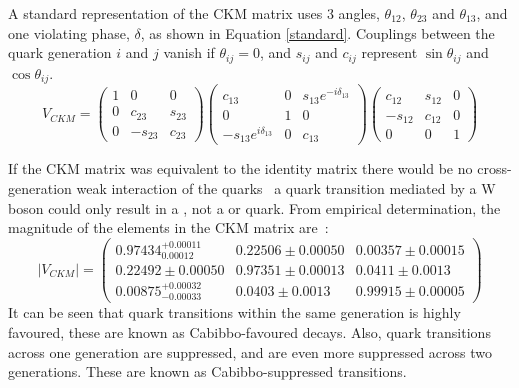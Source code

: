 A standard representation of the CKM matrix uses 3 angles, $\theta_{12}$, $\theta_{23}$ and $\theta_{13}$, and one \CP violating phase, $\delta$, as shown in Equation \ref{standard}. Couplings between the quark generation $i$ and $j$ vanish if $\theta_{ij} = 0$, and $s_{ij}$ and $c_{ij}$ represent $\sin\theta_{ij}$ and $\cos\theta_{ij}$.
\begin{equation}
V_{CKM} = \begin{pmatrix} 1 & 0 & 0 \\ 
0 & c_{23} & s_{23} \\ 
0 & -s_{23} & c_{23} \end{pmatrix}
\begin{pmatrix} c_{13} & 0 & s_{13}e^{-i\delta_{13}} \\ 
0 & 1 & 0 \\ 
-s_{13}e^{i\delta_{13}} & 0 & c_{13} \end{pmatrix}
\begin{pmatrix} c_{12} & s_{12} & 0 \\ 
-s_{12} & c_{12} & 0 \\ 
0 & 0 & 1 \end{pmatrix}
\label{standard}
\end{equation}

If the CKM matrix was equivalent to the identity matrix there would be no cross-generation weak interaction of the quarks \eg\ a \uquark quark transition mediated by a W boson could only result in a \dquark, not a \squark or \bquark quark. From empirical determination, the magnitude of the elements in the CKM matrix are~\cite{PDG2016}:
\begin{equation}
| V_{CKM} | = \begin{pmatrix} 0.97434^{+0.00011}_{0.00012} & 0.22506 \pm 0.00050 & 0.00357 \pm 0.00015 \\ 0.22492 \pm 0.00050 & 0.97351 \pm 0.00013 & 0.0411 \pm 0.0013 \\ 0.00875^{+0.00032}_{-0.00033} & 0.0403 \pm 0.0013 & 0.99915 \pm 0.00005 \end{pmatrix}
\end{equation}
It can be seen that quark transitions within the same generation is highly favoured, these are known as Cabibbo-favoured decays. Also, quark transitions across one generation are suppressed, and are even more suppressed across two generations. These are known as Cabibbo-suppressed transitions. 

